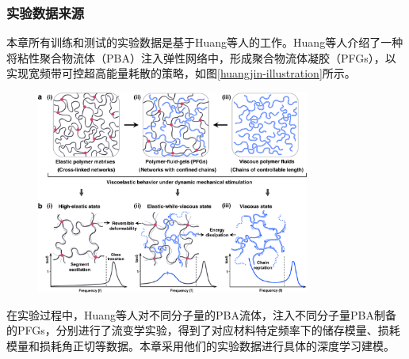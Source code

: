 \subsubsection{实验数据来源}
本章所有训练和测试的实验数据是基于Huang等人的工作\cite{huangUltrahighEnergydissipationElastomers2021}。Huang等人介绍了一种将粘性聚合物流体（PBA）注入弹性网络中，形成聚合物流体凝胶（PFGs），以实现宽频带可控超高能量耗散的策略，如图\ref{huangjin-illustration}所示。
\begin{figure}[htbp]
  \centering
  \includegraphics[width=0.8\textwidth]{Fig/huangjin.png}
\end{figure}
在实验过程中，Huang等人对不同分子量的PBA流体，注入不同分子量PBA制备的PFGs，分别进行了流变学实验，得到了对应材料特定频率下的储存模量、损耗模量和损耗角正切等数据。本章采用他们的实验数据进行具体的深度学习建模。

